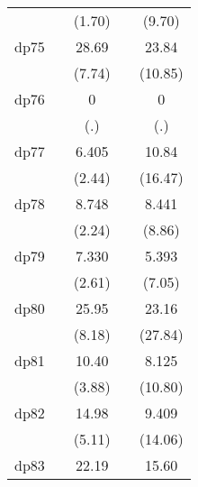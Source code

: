 {\begin{tabular}{l*{4}{c}}
            &                     &      (1.70)         &                     &      (9.70)         \\
[1em]
dp75        &                     &       28.69\sym{***}&                     &       23.84\sym{***}\\
            &                     &      (7.74)         &                     &     (10.85)         \\
[1em]
dp76        &                     &           0         &                     &           0         \\
            &                     &         (.)         &                     &         (.)         \\
[1em]
dp77        &                     &       6.405\sym{*}  &                     &       10.84\sym{***}\\
            &                     &      (2.44)         &                     &     (16.47)         \\
[1em]
dp78        &                     &       8.748\sym{*}  &                     &       8.441\sym{***}\\
            &                     &      (2.24)         &                     &      (8.86)         \\
[1em]
dp79        &                     &       7.330\sym{**} &                     &       5.393\sym{***}\\
            &                     &      (2.61)         &                     &      (7.05)         \\
[1em]
dp80        &                     &       25.95\sym{***}&                     &       23.16\sym{***}\\
            &                     &      (8.18)         &                     &     (27.84)         \\
[1em]
dp81        &                     &       10.40\sym{***}&                     &       8.125\sym{***}\\
            &                     &      (3.88)         &                     &     (10.80)         \\
[1em]
dp82        &                     &       14.98\sym{***}&                     &       9.409\sym{***}\\
            &                     &      (5.11)         &                     &     (14.06)         \\
[1em]
dp83        &                     &       22.19\sym{***}&                     &       15.60\sym{***}\\

\end{tabular}}
